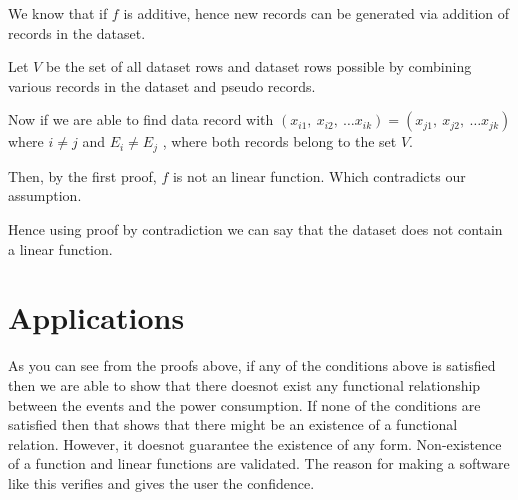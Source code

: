 We know that if \(f\) is additive, hence new records can be generated via addition of records in the dataset.

Let \(V\) be the set of all dataset rows and dataset rows possible by combining various records in the dataset and pseudo records.

Now if we are able to find data record with \((x_{i1},\ x_{i2},\ \ldots x_{ik}) = (x_{j1},\ x_{j2},\ \ldots x_{jk})\) where \(i \neq j\) and \(E_i \neq E_j\) , where both records belong to the set \(V\).

Then, by the first proof, \(f\) is not an linear function. Which contradicts our assumption.

Hence using proof by contradiction we can say that the dataset does not contain a linear function.

\section{Applications}

As you can see from the proofs above, if any of the conditions above is satisfied then we are able to show that there doesnot exist any functional relationship between the events and the power consumption. If none of the conditions are satisfied then that shows that there might be an existence of a functional relation. However, it doesnot guarantee the existence of any form. Non-existence of a function and linear functions are validated. The reason for making a software like this verifies and gives the user the confidence.
